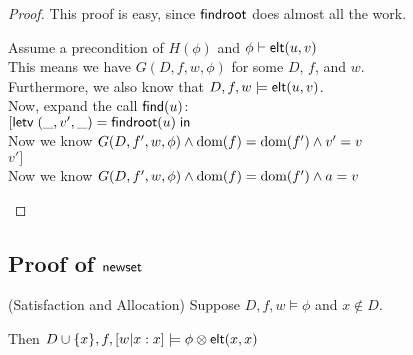 \begin{proof}
This proof is easy, since $\mathsf{findroot}$ does almost all the work.
\begin{tabbedproof}
\oo Assume a precondition of $H(\phi)$ and ${\phi} \vdash \mathsf{elt}({u}, {v})$ \\
\ooo This means we have $G(D, f, w, \phi)$ for some $D$, $f$, and $ w$. \\
\ooo Furthermore, we also know that $D, f, w \models \mathsf{elt}({u}, {v})$. \\
\ooo Now, expand the call $\mathsf{find}(u)$: \\
\ooo $[\mathsf{letv}\;(\_, v', \_) = \mathsf{findroot}(u)\;\mathsf{in}\;$ \\
\ooo Now we know $G(D, f', w, \phi) \land \mbox{dom}({f}) = \mbox{dom}({f'}) \land v' = v$ \\
\ooo $v']$ \\
\ooo Now we know $G(D, f', w, \phi) \land \mbox{dom}({f}) = \mbox{dom}({f'}) \land a = v$ 
\end{tabbedproof}
\end{proof}

\subsection{Proof of $\mathsf{newset}$}

\begin{lemma}{(Satisfaction and Allocation)}
Suppose $D, f, w \models \phi$ and $x \not \in D$. 

Then $D \cup \{{x}\}, f, [w|x:x] \models \phi \otimes \mathsf{elt}({x}, {x})$
\end{lemma}

